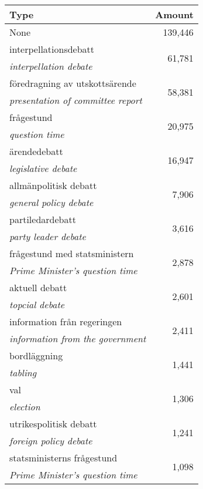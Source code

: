 \begin{center}
\begin{longtable}{|l|r|}
\hline
\normalsize{\textbf{Type}} & \normalsize{\textbf{Amount}} \\ \hline
None & 139,446 \\ \hline
interpellationsdebatt & \multirow{2}{*}{61,781} \\ \emph{interpellation debate} & \multicolumn{1}{c|}{} \\ \hline
föredragning av utskottsärende & \multirow{2}{*}{58,381} \\ \emph{presentation of committee report} & \multicolumn{1}{c|}{} \\ \hline
frågestund & \multirow{2}{*}{20,975} \\ \emph{question time} & \multicolumn{1}{c|}{} \\ \hline
ärendedebatt & \multirow{2}{*}{16,947} \\ \emph{legislative debate} & \multicolumn{1}{c|}{} \\ \hline
allmänpolitisk debatt & \multirow{2}{*}{7,906} \\ \emph{general policy debate} & \multicolumn{1}{c|}{} \\ \hline
partiledardebatt & \multirow{2}{*}{3,616} \\ \emph{party leader debate} & \multicolumn{1}{c|}{} \\ \hline
frågestund med statsministern & \multirow{2}{*}{2,878} \\ \emph{Prime Minister's question time} & \multicolumn{1}{c|}{} \\ \hline
aktuell debatt & \multirow{2}{*}{2,601} \\ \emph{topcial debate} & \multicolumn{1}{c|}{} \\ \hline
information från regeringen & \multirow{2}{*}{2,411} \\ \emph{information from the government} & \multicolumn{1}{c|}{} \\ \hline
bordläggning & \multirow{2}{*}{1,441} \\ \emph{tabling} & \multicolumn{1}{c|}{} \\ \hline
val & \multirow{2}{*}{1,306} \\ \emph{election} & \multicolumn{1}{c|}{} \\ \hline
utrikespolitisk debatt & \multirow{2}{*}{1,241} \\ \emph{foreign policy debate} & \multicolumn{1}{c|}{} \\ \hline
statsministerns frågestund & \multirow{2}{*}{1,098} \\ \emph{Prime Minister's question time} & \multicolumn{1}{c|}{} \\ \hline

\end{longtable}
\end{center}
